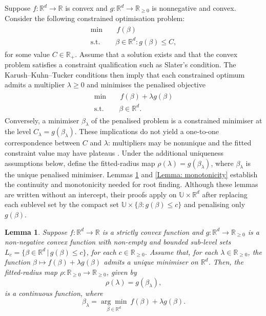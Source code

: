 \documentclass[12pt]{article}
\newtheorem{lemma}{Lemma}
\theoremstyle{remark}
\theoremstyle{plain}
\begin{document}
Suppose $f:\mathbb R^d\to\mathbb R$ is convex and $g:\mathbb R^d\to\mathbb R_{\geq0}$ is nonnegative and convex. Consider the following constrained optimisation problem:
\begin{align}
\begin{split}\min\quad & \,f(\beta)\\
\mathrm{s.t.}\quad & \beta\in\mathbb{R}^{d}:g(\beta)\leq C,
\end{split}
\label{Eqs: General constrained problem}
\end{align}
for some value $C\in\mathbb{R}_{+}$. Assume that a solution exists and that the convex problem satisfies a constraint qualification such as Slater's condition. The Karush--Kuhn--Tucker conditions then imply that each constrained optimum admits a multiplier $\lambda\ge0$ and minimises the penalised objective
\begin{align}
\begin{split}\min\quad & \,f(\beta)+\lambda g(\beta)\\
\mathrm{s.t.}\quad & \beta\in\mathbb{R}^{d}.
\end{split}
\label{Eqs: General unconstrained problem}
\end{align}
Conversely, a minimiser $\beta_\lambda$ of the penalised problem is a constrained minimiser at the level $C_\lambda=g(\beta_\lambda)$. These implications do not yield a one-to-one correspondence between $C$ and $\lambda$: multipliers may be nonunique and the fitted constraint value may have plateaus \citep{kloft_lp-norm_2011}. Under the additional uniqueness assumptions below, define the fitted-radius map $\rho(\lambda)=g(\beta_\lambda)$, where $\beta_\lambda$ is the unique penalised minimiser. Lemmas \ref{Lemma: continuity} and \ref{Lemma: monotonicity} establish the continuity and monotonicity needed for root finding. Although these lemmas are written without an intercept, their proofs apply on $\mathbb U\times\mathbb R^d$ after replacing each sublevel set by the compact set $\mathbb U\times\{\beta:g(\beta)\le c\}$ and penalising only $g(\beta)$.
\begin{lemma}\label{Lemma: continuity}
Suppose $f:\mathbb{R}^{d}\to\mathbb{R}$ is a strictly convex
function and $g:\mathbb{R}^{d}\to\mathbb{R}_{\geq0}$ is a non-negative
convex function with non-empty and bounded sub-level sets $L_{c}=\{\beta\in\mathbb{R}^{d}\,|\,g(\beta)\leq c\}$,
for each $c\in\mathbb{R}_{\geq0}$. Assume that, for each $\lambda\in\mathbb{R}_{\geq0}$, the function
$\beta\mapsto f\left(\beta\right)+\lambda g\left(\beta\right)$ admits a unique minimiser on $\mathbb{R}^{d}$. Then, the fitted-radius map $\rho:\mathbb{R}_{\geq0}\to\mathbb{R}_{\geq0}$,
given by
\[
\rho(\lambda)=g(\beta_{\lambda}),
\]
is a continuous function, where
\[
\beta_{\lambda}=\underset{\beta\in\mathbb{R}^{d}}{\arg\min}\ f\left(\beta\right)+\lambda g\left(\beta\right).
\]
\end{lemma}
\end{document}
